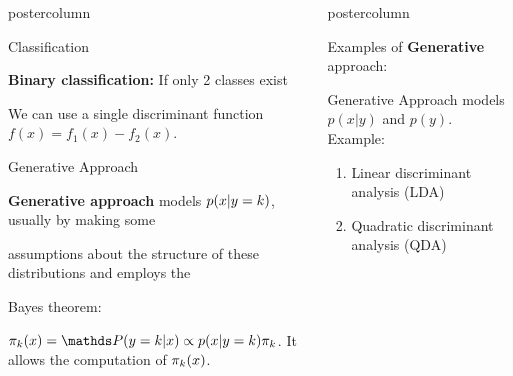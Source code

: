 \documentclass{beamer}
\newlength{\columnheight} %
\begin{document}
\begin{frame}[fragile]{}
\begin{columns}
\begin{column}{.31\textwidth}
\begin{beamercolorbox}[center]{postercolumn}
\begin{minipage}{.98\textwidth}
{\begin{myblock}{Classification}
						\begin{codebox}
							 \textbf{Binary classification: }If only 2 classes exist
						\end{codebox}
						\hspace*{1ex}We can use a single discriminant function $f(x) = f_1(x) - f_2(x)$.
						\\

					\end{myblock}
					\begin{myblock}{Generative Approach}
						\begin{codebox}
							\textbf{Generative approach} models $p(x | y=k)$, usually by making some
						\end{codebox}
						\begin{codebox}
						    assumptions about the structure of these distributions and employs the
						\end{codebox}
						\begin{codebox}
						    Bayes theorem:
						\end{codebox}
						\hspace*{1ex}$\pikx = \postk \propto \pdfxyk \pik$. It allows the computation of \hspace*{1ex}$\pi_k(x)$.
						\\
					\end{myblock}\vfill
				}
			\end{minipage}
		\end{beamercolorbox}
	\end{column}
	\begin{column}{.31\textwidth}
		\begin{beamercolorbox}[center]{postercolumn}
			\begin{minipage}{.98\textwidth}
				\parbox[t][\columnheight]{\textwidth}{
					\begin{myblock}{}
					    \begin{codebox}
							Examples of \textbf{Generative} approach:
					    \end{codebox}
						\hspace*{1ex}Generative Approach models $p(x|y)$ and $p(y)$. \\\hspace*{1ex}Example: 
						\begin{enumerate}
                        \item Linear discriminant analysis (LDA)
                        \item Quadratic discriminant analysis (QDA)

\end{enumerate}
\end{myblock}}
\end{minipage}
\end{beamercolorbox}
\end{column}
\end{columns}
\end{frame}
\end{document}

